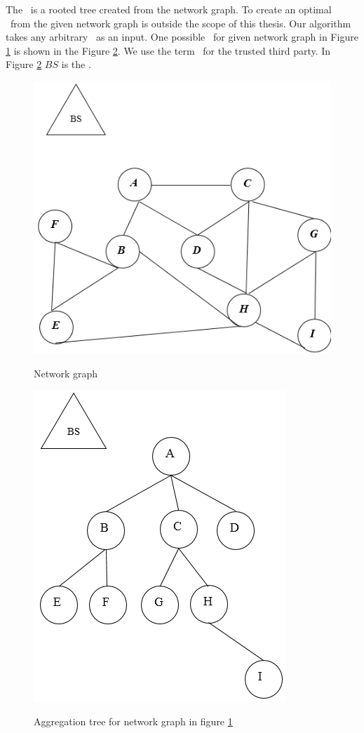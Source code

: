 	The \at\ is a rooted tree created from the network graph. 
	To create an optimal \at\ from the given network graph is outside the scope of this thesis.
	Our algorithm takes any arbitrary \at\ as an input. 
	One possible \at\ for given network graph in Figure \ref{fig:ng} is shown in the Figure \ref{fig:at}.
	We use the term \bs\  for the trusted third party. In Figure \ref{fig:at} $BS$ is the \bs.
		
	\begin{figure}[hp]
		\centering
		\includegraphics[scale = 0.5]{images/network-graph.png}\\
		\caption{Network graph}
		\label{fig:ng}
	\end{figure}

	\begin{figure}[hp]
		\centering
		\includegraphics[scale = 0.5]{images/aggregation-tree.png}\\
		\caption{Aggregation tree for network graph in figure \ref{fig:ng}}
		\label{fig:at}
	\end{figure}

